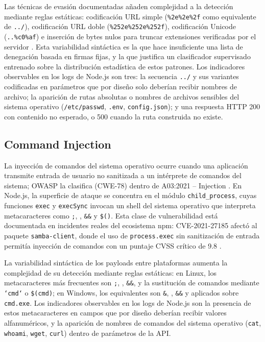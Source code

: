 Las técnicas de evasión documentadas añaden complejidad a la detección mediante reglas
estáticas: codificación URL simple (\texttt{\%2e\%2e\%2f} como equivalente de \texttt{../}),
codificación URL doble (\texttt{\%252e\%252e\%252f}), codificación Unicode (\texttt{..\%c0\%af}) e
inserción de bytes nulos para truncar extensiones verificadas por el servidor \cite{owasptraversal}. Esta variabilidad sintáctica es la que hace insuficiente una lista de denegación
basada en firmas fijas, y la que justifica un clasificador supervisado entrenado sobre la
distribución estadística de estos patrones. Los indicadores observables en los logs de Node.js son
tres: la secuencia \texttt{../} y sus variantes codificadas en parámetros que por diseño solo deberían
recibir nombres de archivo; la aparición de rutas absolutas o nombres de archivos sensibles del
sistema operativo (\texttt{/etc/passwd}, \texttt{.env}, \texttt{config.json}); y una respuesta HTTP 200
con contenido no esperado, o 500 cuando la ruta construida no existe.

\subsection{Command Injection}
La inyección de comandos del sistema operativo ocurre cuando una aplicación transmite entrada de
usuario no sanitizada a un intérprete de comandos del sistema; OWASP la clasifica (CWE-78) dentro
de A03:2021 -- Injection \cite{owaspa03_2021}. En Node.js, la
superficie de ataque se concentra en el módulo \texttt{child\_process}, cuyas funciones
\texttt{exec} y \texttt{execSync} invocan un shell del sistema operativo que interpreta
metacaracteres como \texttt{;}, \texttt{\textbar}, \texttt{\&\&} y \texttt{\$()}. Esta clase de
vulnerabilidad está documentada en incidentes reales del ecosistema npm: CVE-2021-27185 afectó
al paquete \texttt{samba-client}, donde el uso de \texttt{process.exec} sin sanitización de entrada
permitía inyección de comandos con un puntaje CVSS crítico de 9.8 \cite{gitlabadvisory2021}.

La variabilidad sintáctica de los payloads entre plataformas aumenta la complejidad de su
detección mediante reglas estáticas: en Linux, los metacaracteres más frecuentes son \texttt{;},
\texttt{\textbar}, \texttt{\&\&}, \texttt{\textbar\textbar} y la sustitución de comandos mediante
\texttt{`cmd`} o \texttt{\$(cmd)}; en Windows, los equivalentes son \texttt{\&}, \texttt{\textbar},
\texttt{\&\&} y \texttt{\textbar\textbar} aplicados sobre \texttt{cmd.exe}. Los indicadores observables
en los logs de Node.js son la presencia de estos metacaracteres en campos que por diseño deberían
recibir valores alfanuméricos, y la aparición de nombres de comandos del sistema operativo
(\texttt{cat}, \texttt{whoami}, \texttt{wget}, \texttt{curl}) dentro de parámetros de la API.

